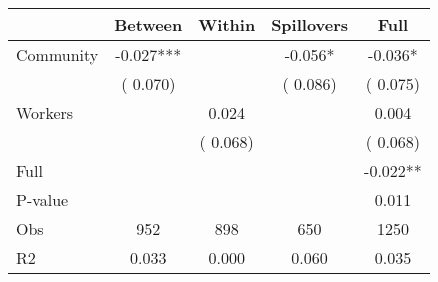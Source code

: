 
\begin{tabular}{l*{4}{c}}\hline&\multicolumn{1}{c}{Between}&\multicolumn{1}{c}{Within}&\multicolumn{1}{c}{Spillovers}&\multicolumn{1}{c}{Full}\\ \hline
 Community             &             -0.027***      &                                               &       -0.056* &        -0.036*                            \\ 
                               &        (       0.070)           &                                       &       (       0.086)     &      (       0.075)                                           \\ 
 Workers       &                                               &        0.024    &                                &             0.004                            \\ 
                               &                                               & (       0.068)                  &                                        &      (       0.068)                                           \\ 
\hline                                                                                                                                                                                                                                            
 Full                  &                                               &                                               &                                        &            -0.022**                                     \\ 
 P-value               &                                               &                                               &                                        &             0.011                                           \\ 
 Obs                   &               952               &       898                       &       650                &              1250                                               \\ 
 R2                    &                      0.033              &              0.000                      &              0.060               &                     0.035                                              \\ 
\hline \end{tabular}                                                                                                                                                                                                              